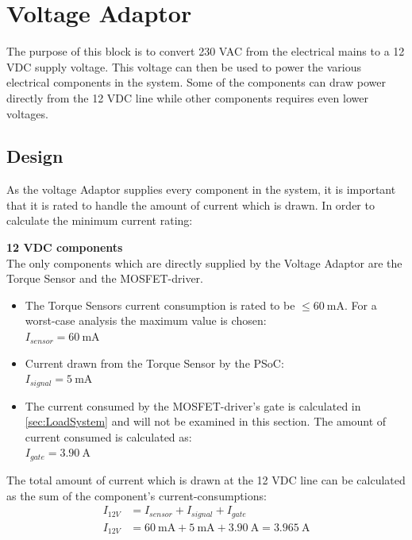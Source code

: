 \section{Voltage Adaptor}
The purpose of this block is to convert 230 VAC from the electrical mains to a 12 VDC supply voltage. This voltage can then be used to power the various electrical components in the system. Some of the components can draw power directly from the 12 VDC line while other components requires even lower voltages.

\subsection{Design} 
As the voltage Adaptor supplies every component in the system, it is important that it is rated to handle the amount of current which is drawn.
In order to calculate the minimum current rating:

\textbf{12 VDC components}\\
The only components which are directly supplied by the Voltage Adaptor are the Torque Sensor and the MOSFET-driver.

\begin{itemize}
	\item The Torque Sensors current consumption is rated to be $\leq  \SI{60}{\milli \ampere}$. For a worst-case analysis the maximum value is chosen:\\
	$I_{sensor} = \SI{60}{\milli \ampere}$
	\item Current drawn from the Torque Sensor by the PSoC:\\
	$I_{signal} = \SI{5}{\milli \ampere}$
	\item The current consumed by the MOSFET-driver's gate is calculated in \ref{sec:LoadSystem} and will not be examined in this section. The amount of current consumed is calculated as:\\
	$I_{gate} = \SI{3.90}{\ampere}$
\end{itemize}

The total amount of current which is drawn at the 12 VDC line can be calculated as the sum of the component's current-consumptions:
\begin{equation}
	\begin{split}
		I_{12V} &= I_{sensor} + I_{signal} + I_{gate}\\
		I_{12V} &= \SI{60}{\milli \ampere} + \SI{5}{\milli \ampere} + \SI{3.90}{\ampere} = \SI{3.965}{\ampere}
	\end{split}
\end{equation}

